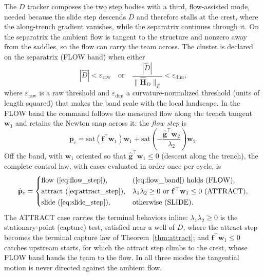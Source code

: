 \documentclass[lettersize,journal]{IEEEtran}
\begin{document}
The $D$ tracker composes the two step bodies with a third,
flow-assisted mode, needed because the slide step descends $D$ and
therefore stalls at the crest, where the along-trench gradient
vanishes, while the separatrix continues through it. On the separatrix
the ambient flow is tangent to the structure and nonzero away from the
saddles, so the flow can carry the team across. The cluster is declared
on the separatrix (FLOW band) when either
\begin{equation}
    |\hat{D}| < \varepsilon_{\text{raw}}
    \quad\text{or}\quad
    \frac{|\hat{D}|}{\|\hat{\mathbf{H}}_D\|_F} < \varepsilon_{\text{dim}},
    \label{eq:flow_band}
\end{equation}
where $\varepsilon_{\text{raw}}$ is a raw threshold and
$\varepsilon_{\text{dim}}$ a curvature-normalized threshold (units of
length squared) that makes the band scale with the local landscape. In
the FLOW band the command follows the measured flow along the trench
tangent $\mathbf{w}_1$ and retains the Newton snap across it: the
\emph{flow step} is
\begin{equation}
    \dot{\mathbf{p}}_c =
    \mathrm{sat}\!\left(\mathbf{f}^\top \mathbf{w}_1\right)\mathbf{w}_1
    + \mathrm{sat}\!\left(-\frac{\hat{\mathbf{g}}^\top
    \mathbf{w}_2}{\lambda_2}\right)\mathbf{w}_2.
    \label{eq:flow_step}
\end{equation}
Off the band, with $\mathbf{w}_1$ oriented so that
$\hat{\mathbf{g}}^\top \mathbf{w}_1 \leq 0$ (descent along the
trench), the complete control law, with cases evaluated in order once
per cycle, is
\begin{equation}
    \dot{\mathbf{p}}_c =
    \begin{cases}
        \text{flow (\ref{eq:flow_step})}, &
            \text{(\ref{eq:flow_band}) holds (FLOW)}, \\[1pt]
        \text{attract (\ref{eq:attract_step})}, &
            \lambda_1\lambda_2 \geq 0 \ \text{or}\
            \mathbf{f}^\top\mathbf{w}_1 \leq 0 \ \text{(ATTRACT)}, \\[1pt]
        \text{slide (\ref{eq:slide_step})}, &
            \text{otherwise (SLIDE)}.
    \end{cases}
    \label{eq:d_selector}
\end{equation}
The ATTRACT case carries the terminal behaviors inline:
$\lambda_1\lambda_2 \geq 0$ is the stationary-point (capture) test,
satisfied near a well of $D$, where the attract step becomes the
terminal capture law of Theorem~\ref{thm:attract}; and
$\mathbf{f}^\top\mathbf{w}_1 \leq 0$ catches upstream starts, for
which the attract step climbs to the crest, whose FLOW band hands the
team to the flow. In all three modes the tangential motion is never
directed against the ambient flow.
\end{document}

